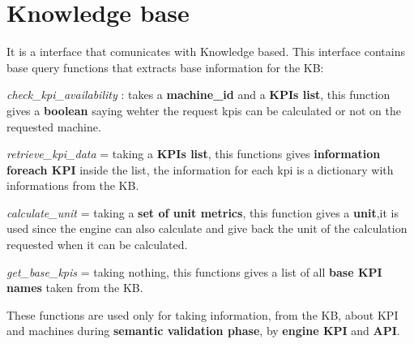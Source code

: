\chapter{Knowledge base}
\hypertarget{md_doc_2_knowledge__base}{}\label{md_doc_2_knowledge__base}
\label{md_doc_2_knowledge__base_autotoc_md14}%
%


It is a interface that comunicates with Knowledge based. This interface contains base query functions that extracts base information for the KB\+:


\begin{DoxyItemize}
\item {\itshape check\+\_\+kpi\+\_\+availability} \+: takes a {\bfseries{machine\+\_\+id}} and a {\bfseries{KPI\textquotesingle{}s list}}, this function gives a {\bfseries{boolean}} saying wehter the request kpis can be calculated or not on the requested machine.
\item {\itshape retrieve\+\_\+kpi\+\_\+data} = taking a {\bfseries{KPI\textquotesingle{}s list}}, this functions gives {\bfseries{information foreach KPI}} inside the list, the information for each kpi is a dictionary with informations from the KB.
\item {\itshape calculate\+\_\+unit} = taking a {\bfseries{set of unit metrics}}, this function gives a {\bfseries{unit}},it is used since the engine can also calculate and give back the unit of the calculation requested when it can be calculated.
\item {\itshape get\+\_\+base\+\_\+kpis} = taking nothing, this functions gives a list of all {\bfseries{base KPI names}} taken from the KB.
\end{DoxyItemize}

These functions are used only for taking information, from the KB, about KPI and machines during {\bfseries{semantic validation phase}}, by {\bfseries{engine KPI}} and {\bfseries{API}}. 